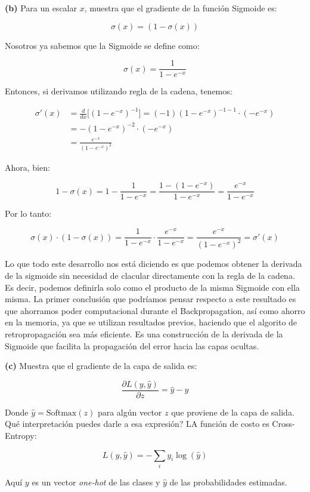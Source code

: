 \begin{myblock}
    \textbf{(b)} Para un escalar $x$, muestra que el gradiente de la función Sigmoide es: 

    \[
        \sigma(x) = (1 - \sigma(x))
    \]
\end{myblock}

Nosotros ya sabemos que la Sigmoide se define como:

\[
    \sigma(x) = \frac{1}{1 - e^{-x}}
\]

Entonces, si derivamos utilizando regla de la cadena, tenemos:

\begin{align*}
        \sigma'(x) &= \frac{d}{dx} \big[(1 - e^{-x})^{-1}\big] = (-1) (1 - e^{-x})^{-1-1} \cdot (-e^{-x})\\
                   &= -(1 - e^{-x})^{-2} \cdot (-e^{-x}) \\
                   &= \frac{e^{-x}}{(1-e^{-x})^2} 
\end{align*}

Ahora, bien:

\[
    1 - \sigma(x) = 1 - \frac{1}{1 - e^{-x}} = \frac{1 - (1- e^{-x})}{1 - e^{-x}} = \frac{e^{-x}}{1 - e^{-x}}
\]

Por lo tanto: 

\[
    \boxed{\sigma(x) \cdot (1 - \sigma(x)) = \frac{1}{1 - e^{-x}} \cdot \frac{e^{-x}}{1 - e^{-x}} = \frac{e^{-x}}{(1 - e^{-x})^2} = \sigma'(x)}
\]

Lo que todo este desarrollo nos está diciendo es que podemos obtener la derivada de la sigmoide sin necesidad de clacular
directamente con la regla de la cadena. Es decir, podemos definirla solo como el producto de la misma 
Sigmoide con ella misma. La primer conclusión que podríamos pensar respecto a este resultado es que ahorramos
poder computacional durante el Backpropagation, así como ahorro en la memoria, ya que se utilizan resultados previos,
haciendo que el algorito de retropropagación sea más eficiente. Es una construcción de la derivada de la 
Sigmoide que facilita la propagación del error hacia las capas ocultas. 


\begin{myblock}
    
    \textbf{(c)} Muestra que el gradiente de la capa de salida es:

    \[
        \frac{\partial L(y, \hat{y})}{\partial z} = \hat{y} - y
    \]

    Donde $\hat{y} = \text{Softmax}(z)$ para algún vector $z$ que proviene de la capa de salida. Qué interpretación
    puedes darle a esa expresión? LA función de costo es Cross-Entropy:

    \[
        L(y, \hat{y}) = - \sum_i y_i \log(\hat{y})
    \]

    Aquí $y$ es un vector \textit{one-hot} de las clases y $\hat{y}$ de las probabilidades estimadas. 
\end{myblock}


